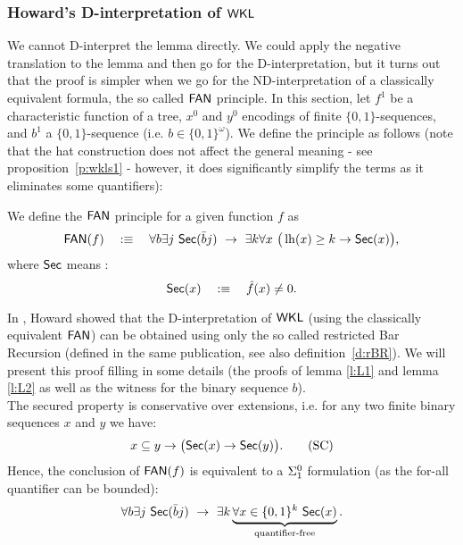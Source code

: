 \subsubsection*{Howard's D-interpretation of $\textsf{\upshape WKL}$} \label{ss:HFI}
We cannot D-interpret the lemma directly. We could apply
the negative translation to the lemma and then go for the D-interpretation, but
it turns out that the proof is simpler when we go for the ND-interpretation
of a classically equivalent formula, the so called $\textsf{\upshape FAN}$ principle.
In this section, let $f^1$ be a 
characteristic function of a tree, 
$x^0$ and $y^0$ encodings of finite $\{0,1\}$-sequences, and
$b^1$ a $\{0,1\}$-sequence (i.e. $b\in\{0,1\}^\omega$). 
We define the  principle as follows (note that the hat construction does not
affect the general meaning - see proposition~\ref{p:wkls1} - however, it does significantly simplify
the terms as it eliminates some quantifiers):
\begin{dfn} We define the $\textsf{\upshape FAN}$ principle for a
given function $f$ as
\[
\FAN(f)\quad:\equiv\quad\forall b \exists j\ \Sec(\bar b j) \ \rightarrow \ 
  \exists k \forall x\ \big(\lh(x)\geq k \rightarrow \Sec(x)\big)
\text{,}\]
where $\textsf{\upshape Sec}$ means :
\[
 \textsf{\upshape Sec}(x)\quad:\equiv\quad \hat f(x)\neq0 \text{.}
\]
\end{dfn}
In \cite{Howard81}, Howard showed that the D-interpretation of $\textsf{\upshape WKL}$
(using the classically equivalent $\textsf{\upshape FAN}$)
can be obtained using only the so called restricted Bar Recursion
(defined in the same publication, see also definition~\ref{d:rBR}). 
We will present this proof filling in some details 
(the proofs of lemma \ref{l:L1} and lemma \ref{l:L2} 
as well as the witness for the binary sequence $b$).\\
The secured property is conservative over
extensions, i.e. for any two finite binary sequences $x$ and $y$ we 
have:
\[
x\subseteq y \rightarrow\big(\textsf{\upshape Sec}(x)\rightarrow \textsf{\upshape Sec}(y)\big)\text{.} \tag{SC}
\]
Hence, the conclusion of $\textsf{\upshape FAN}(f)$ is equivalent to a 
$\Sigma^0_1$ formulation (as the for-all quantifier 
can be bounded):
\[
\forall b \exists j\ \Sec(\bar b j) \ \rightarrow \ \exists k 
\underbrace{\forall x\in\{0,1\}^k\ \Sec(x)}_{\text{quantifier-free}}
\text{.}\]
